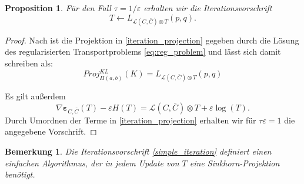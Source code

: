 \documentclass[11pt,a4paper]{article}
\newtheorem{proposition}[theorem]{Proposition}
\newtheorem{remark}[theorem]{Bemerkung}
\numberwithin{equation}{section}
\begin{document}
	\begin{proposition} \label{prop:iteration_GW_eps}
		Für den Fall $\tau= 1/\varepsilon$ erhalten wir die Iterationsvorschrift
		\begin{equation}
		T \leftarrow L_{\mathcal{L} (C, \bar{C}) \otimes T}(p,q). \label{simple_iteration}
		\end{equation}
		
	
	\end{proposition}
	\begin{proof}
		Nach \cite{iterative_bregman_projections} ist die Projektion in \ref{iteration_projection} gegeben durch die Lösung des regularisierten Transportproblems \ref{eq:reg_problem} und lässt sich damit schreiben als:
		\begin{equation}
		Proj_{\Pi(a,b)}^{KL}(K) = L_{\mathcal{L} (C, \bar{C}) \otimes T}(p,q)
		\end{equation}
		
		Es gilt außerdem
		\begin{equation}
		\nabla \boldsymbol{\varepsilon}_{C, \bar{C}}(T) -\varepsilon H(T) = \mathcal{L}(C,\bar{C}) \otimes T + \varepsilon\log (T).
		\end{equation}
		Durch Umordnen der Terme in \autoref{iteration_projection} erhalten wir für $\tau \varepsilon = 1$ die angegebene Vorschrift.
	\end{proof}
	
	\begin{remark}
		Die Iterationsvorschrift \ref{simple_iteration} definiert einen einfachen Algorithmus, der in jedem Update von $T$ eine Sinkhorn-Projektion benötigt.
	\end{remark}

	
\end{document}
